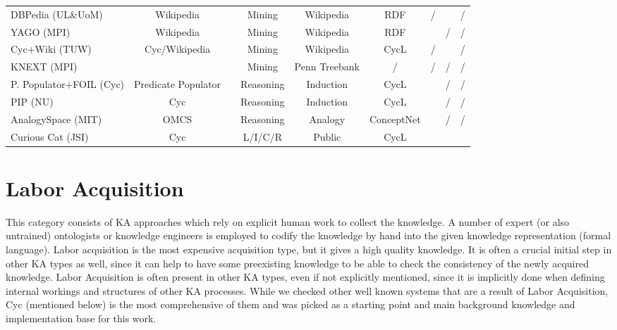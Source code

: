 \begin{landscape}
\begin{table}[htb]
\begin{adjustbox}{width=1.4\textwidth}
\begin{tabular}{lclcccccc}
		DBPedia (UL\&UoM) & Wikipedia & \parencite{Lehmann2015} & Mining & Wikipedia &  RDF & / &\checkmark & / \\
		YAGO (MPI) & Wikipedia & \parencite{Rebele2016} & Mining & Wikipedia &  RDF & \checkmark & / & / \\
		Cyc+Wiki (TUW) & Cyc/Wikipedia & \parencite{Medelyan2008} & Mining & Wikipedia &  CycL & / &\checkmark & / \\
		KNEXT (MPI) & \ & \parencite{Schubert2002} & Mining & Penn Treebank &  / & / & / & / \\
	    P. Populator+FOIL (Cyc) & Predicate Populator & \parencite{Witbrock2005} & Reasoning & Induction &  CycL & \checkmark & / & / \\
	    PIP (NU) & Cyc & \parencite{Sharma2010} & Reasoning & Induction &  CycL & \checkmark & / & / \\
	    AnalogySpace (MIT) & OMCS & \parencite{Speer2008} & Reasoning & Analogy &  ConceptNet & \checkmark & / & / \\
		\hline	
		Curious Cat (JSI) & Cyc & \parencite{Bradesko2017} & L/I/C/R & Public &  CycL & \checkmark & \checkmark & \checkmark \\
	\end{tabular}	
	\end{adjustbox}
\end{table}
\end{landscape}

\section{Labor Acquisition}
\label{section:labouracquisition}
This category consists of KA approaches which rely on explicit human work to 
collect the knowledge. A number of expert (or also untrained) ontologists or 
knowledge engineers is employed to codify the knowledge by hand into the given 
knowledge representation (formal language). Labor acquisition is the most 
expensive acquisition type, but it gives a high quality knowledge. It is often a
crucial initial step in other KA types as well, since it can help to have some 
preexisting knowledge to be able to check the consistency of the newly acquired
knowledge. Labor Acquisition is often present in other KA types, even if not 
explicitly mentioned, since it is implicitly done when defining internal 
workings and structures of other KA processes. While we checked other well 
known systems that are a result of Labor Acquisition, Cyc (mentioned below) is 
the most comprehensive of them and was picked as a starting point and main 
background knowledge and implementation base for this work.

